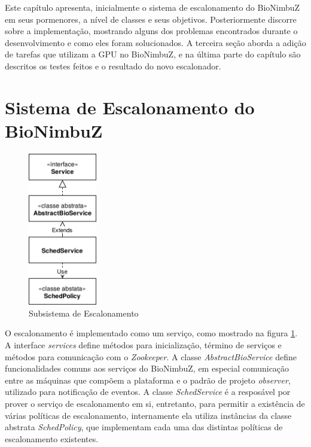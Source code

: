 
Este capítulo apresenta, inicialmente o sistema de escalonamento do BioNimbuZ em seus pormenores, a nível de classes e seus objetivos. Posteriormente discorre sobre a implementação, mostrando alguns dos problemas encontrados durante o desenvolvimento e como eles foram solucionados. A terceira seção aborda a adição de tarefas que utilizam a \acrshort{GPU} no BioNimbuZ, e na última parte do capítulo são descritos os testes feitos e o resultado do novo escalonador.

\section{Sistema de Escalonamento do BioNimbuZ}

\begin{figure}[htbp]
	\centerline{\includegraphics[width=3cm]{img/SubsistemaDeEscalonamento.png}}
	\caption{Subsistema de Escalonamento}
	\label{SubsistemaDeEscalonamento}
\end{figure}


O escalonamento é implementado como um serviço, como mostrado na figura \ref{SubsistemaDeEscalonamento}. A interface \textit{services} define métodos para inicialização, término de serviços e métodos para comunicação com o \textit{Zookeeper}. A classe \textit{AbstractBioService} define funcionalidades comuns aos serviços do BioNimbuZ, em especial comunicação entre as máquinas que compõem a plataforma e o padrão de projeto \textit{observer}, utilizado para notificação de eventos. A classe \textit{SchedService} é a resposável por prover o serviço de escalonamento em si, entretanto, para permitir a existência de várias políticas de escalonamento, internamente ela utiliza instâncias da classe abstrata \textit{SchedPolicy}, que implementam cada uma das distintas políticas de escalonamento existentes.


